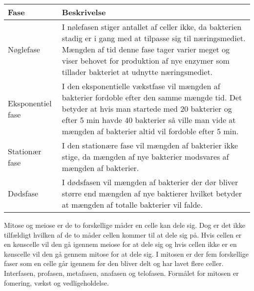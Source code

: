 \begin{longtable}{| m{3cm} | m{14cm} |}
    Fase & Beskrivelse \\ \hline
    
    Nøglefase & I nølefasen stiger antallet af celler ikke, da bakterien stadig er i gang med at tilpasse sig til næringsmediet. Mængden af tid denne fase tager varier meget og viser behovet for produktion af nye enzymer som tillader bakteriet at udnytte næringsmediet. \\ \hline

    Eksponentiel fase &  I den eksponentielle vækstfase vil mængden af bakterier fordoble efter den samme mængde tid. Det betyder at hvis man startede med 20 bakterier og efter 5 min havde 40 bakterier så ville man vide at mængden af bakterier altid vil fordoble efter 5 min. \\ \hline

    Stationær fase &  I den stationære fase vil mængden af bakterier ikke stige, da mængden af nye bakterier modsvares af mængden af bakterier. \\  \hline 

    Dødsfase & I dødsfasen vil mængden af bakterier der dør bliver større end mængden af nye baktierer hvilket betyder at mængden af totalle bakterier vil falde. \\ \hline

\end{longtable}

Mitose og meiose er de to forskellige måder en celle kan dele sig. Dog er det ikke tilfældigt hvilken af de to måder cellen kommer til at dele sig på. Hvis cellen er en kønscelle vil den gå igennem meiose for at dele sig og hvis cellen ikke er en kønscelle vil den gå gennem mitose for at dele sig.
I mitosen er der fem forskellige faser som en celle går igennem før den bliver delt og har lavet flere celler. Interfasen, profasen, metafasen, anafasen og telofasen. Formålet for mitosen er fomering, vækst og vedligeholdelse.

